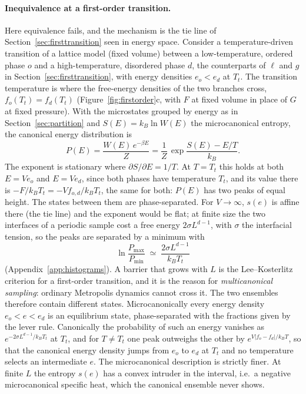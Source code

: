 \documentclass[10pt,a4paper]{article}
\theoremstyle{remark}
\begin{document}
\paragraph{Inequivalence at a first-order transition.}
\label{sec:firstorder}
Here equivalence fails, and the mechanism is the tie line of
Section~\ref{sec:firsttransition} seen in energy space. Consider a
temperature-driven transition of a lattice model (fixed volume) between a
low-temperature, ordered phase $o$ and a high-temperature, disordered phase
$d$, the counterparts of $\ell$ and $g$ in Section~\ref{sec:firsttransition},
with energy densities $e_o<e_d$ at $T_t$. The transition temperature is where
the free-energy densities of the two branches cross, $f_o(T_t)=f_d(T_t)$
(Figure~\ref{fig:firstorder}c, with $F$ at fixed volume in place of $G$ at
fixed pressure). With the microstates grouped by energy as in
Section~\ref{sec:partition} and $S(E)=k_B\ln W(E)$ the microcanonical
entropy, the canonical energy distribution is
\[
  P(E)=\frac{W(E)\,e^{-\beta E}}{Z}=\frac{1}{Z}\,\exp\frac{S(E)-E/T}{k_B} .
\]
The exponent is stationary where $\partial S/\partial E=1/T$. At $T=T_t$ this
holds at both $E=Ve_o$ and $E=Ve_d$, since both phases have temperature $T_t$,
and its value there is $-F/k_BT_t=-Vf_{o,d}/k_BT_t$, the same for both: $P(E)$
has two peaks of equal height. The states between them are phase-separated.
For $V\to\infty$, $s(e)$ is affine there (the tie line) and the exponent would
be flat; at finite size the two interfaces of a periodic sample cost a free
energy $2\sigma L^{d-1}$, with $\sigma$ the interfacial tension, so the peaks
are separated by a minimum with
\[
  \ln\frac{P_{\max}}{P_{\min}}\;\simeq\;\frac{2\sigma L^{d-1}}{k_BT_t}
\]
(Appendix~\ref{app:histograms}). A barrier that grows with $L$ is the
Lee--Kosterlitz criterion for a first-order transition, and it is the reason
for \emph{multicanonical sampling}: ordinary Metropolis dynamics cannot cross
it. The two ensembles therefore contain different states. Microcanonically
every energy density $e_o<e<e_d$ is an equilibrium state, phase-separated with
the fractions given by the lever rule. Canonically the probability of such an
energy vanishes as $e^{-2\sigma L^{d-1}/k_BT_t}$ at $T_t$, and for $T\neq T_t$
one peak outweighs the other by $e^{V|f_o-f_d|/k_BT}$, so that the canonical
energy density jumps from $e_o$ to $e_d$ at $T_t$ and no temperature selects
an intermediate $e$. The microcanonical description is strictly finer. At
finite $L$ the entropy $s(e)$ has a convex intruder in the interval, i.e.\ a
negative microcanonical specific heat, which the canonical ensemble never
shows.
\end{document}
